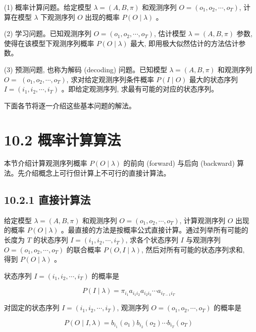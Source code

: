 \documentclass[10pt]{article}
\begin{document}
(1) 概率计算问题。给定模型 $\lambda=(A, B, \pi)$ 和观测序列 $O=\left(o_{1}, o_{2}, \cdots, o_{T}\right)$, 计算在模型 $\lambda$ 下观测序列 $O$ 出现的概率 $P(O \mid \lambda)$ 。

(2) 学习问题。已知观测序列 $O=\left(o_{1}, o_{2}, \cdots, o_{T}\right)$, 估计模型 $\lambda=(A, B, \pi)$ 参数, 使得在该模型下观测序列概率 $P(O \mid \lambda)$ 最大, 即用极大似然估计的方法估计参数。

(3) 预测问题, 也称为解码 (decoding) 问题。已知模型 $\lambda=(A, B, \pi)$ 和观测序列 $O=$ $\left(o_{1}, o_{2}, \cdots, o_{T}\right)$, 求对给定观测序列条件概率 $P(I \mid O)$ 最大的状态序列 $I=\left(i_{1}, i_{2}, \cdots, i_{T}\right)$ 。即给定观测序列, 求最有可能的对应的状态序列。

下面各节将逐一介绍这些基本问题的解法。

\section*{10.2 概率计算算法}
本节介绍计算观测序列概率 $P(O \mid \lambda)$ 的前向 (forward) 与后向 (backward) 算法。先介绍概念上可行但计算上不可行的直接计算法。

\subsection*{10.2.1 直接计算法}
给定模型 $\lambda=(A, B, \pi)$ 和观测序列 $O=\left(o_{1}, o_{2}, \cdots, o_{T}\right)$, 计算观测序列 $O$ 出现的概率 $P(O \mid \lambda)$ 。最直接的方法是按概率公式直接计算。通过列举所有可能的长度为 $T$ 的状态序列 $I=\left(i_{1}, i_{2}, \cdots, i_{T}\right)$, 求各个状态序列 $I$ 与观测序列 $O=\left(o_{1}, o_{2}, \cdots, o_{T}\right)$ 的联合概率 $P(O, I \mid \lambda)$, 然后对所有可能的状态序列求和, 得到 $P(O \mid \lambda)$ 。

状态序列 $I=\left(i_{1}, i_{2}, \cdots, i_{T}\right)$ 的概率是


\begin{equation*}
P(I \mid \lambda)=\pi_{i_{1}} a_{i_{1} i_{2}} a_{i_{2} i_{3}} \cdots a_{i_{T-1} i_{T}} \tag{10.10}
\end{equation*}


对固定的状态序列 $I=\left(i_{1}, i_{2}, \cdots, i_{T}\right)$, 观测序列 $O=\left(o_{1}, o_{2}, \cdots, o_{T}\right)$ 的概率是


\begin{equation*}
P(O \mid I, \lambda)=b_{i_{1}}\left(o_{1}\right) b_{i_{2}}\left(o_{2}\right) \cdots b_{i_{T}}\left(o_{T}\right) \tag{10.11}
\end{equation*}
\end{document}
